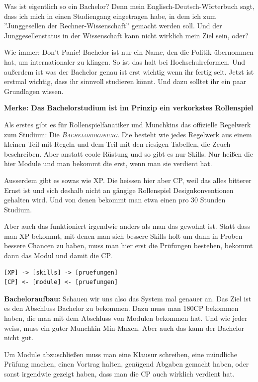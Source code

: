 Was ist eigentlich so ein Bachelor? Denn mein Englisch-Deutsch-W\"orterbuch
sagt, dass ich mich in einen Studiengang eingetragen habe, in dem ich zum
''Junggesellen der Rechner-Wissenschaft'' gemacht werden soll. Und der
Junggesellenstatus in der Wissenschaft kann nicht wirklich mein Ziel sein, oder?

Wie immer: Don't Panic! Bachelor ist nur ein Name, den die Politik \"ubernommen
hat, um internationaler zu klingen.  So ist das halt bei Hochschulreformen. Und
au{\ss}erdem ist was der Bachelor genau ist erst wichtig wenn ihr fertig seit.
Jetzt ist erstmal wichtig, dass ihr sinnvoll studieren k\"onnt. Und dazu solltet
ihr ein paar Grundlagen wissen.

\textbf{Merke: Das Bachelorstudium ist im Prinzip ein verkorkstes Rollenspiel}

Als erstes gibt es f\"ur Rollenspielfanatiker und Munchkins das offizielle
Regelwerk zum Studium: Die \textsc{\textit{Bachelorordnung}}. Die besteht wie jedes
Regelwerk aus einem kleinen Teil mit Regeln
und dem Teil mit den riesigen
Tabellen, die Zeuch beschreiben. Aber anstatt coole R\"ustung und so gibt es
nur Skills. Nur hei{\ss}en die hier Module und man bekommt die erst, wenn man sie
verdient hat.

Ausserdem gibt es sowas wie XP. Die heissen hier aber CP, weil das alles
bitterer Ernst ist und sich deshalb nicht an g\"angige Rollenspiel
Designkonventionen gehalten wird. Und von denen bekommt man etwa einen pro 30
Stunden Studium.

Aber auch das funktioniert irgendwie anders als man das gewohnt ist. Statt dass
man XP bekommt, mit denen man sich bessere Skills holt um dann in Proben
bessere Chancen zu haben, muss man hier erst die Pr\"ufungen bestehen, bekommt
dann das Modul und damit die CP.

{\large
\begin{verbatim}
[XP] -> [skills] -> [pruefungen]
[CP] <- [module] <- [pruefungen]
\end{verbatim}}

\textbf{Bacheloraufbau:}
Schauen wir uns also das System mal genauer an.
Das Ziel ist es den Abschluss Bachelor zu bekommen. Dazu muss man 180CP
bekommen haben, die man mit dem Abschluss von Modulen bekommen hat. Und wie
jeder weiss, muss ein guter Munchkin Min-Maxen. Aber auch das kann der Bachelor
nicht gut.

Um Module abzuschlie\ss en muss man eine Klausur schreiben, eine m\"undliche
Pr\"ufung machen, einen Vortrag halten, gen\"ugend Abgaben gemacht haben, oder
sonst irgendwie gezeigt haben, dass man die CP auch wirklich verdient hat.


